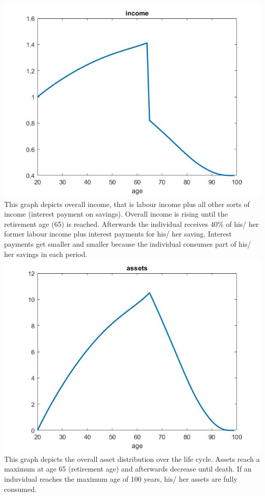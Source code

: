 \documentclass[12pt,a4paper]{article}
\begin{document}
\includegraphics[width=14cm]{Graphs/Figure8} \\
This graph depicts overall income, that is labour income plus all other sorts of income (interest payment on savings). Overall income is rising until the retirement age (65) is reached. Afterwards the individual receives 40\% of his/ her former labour income plus interest payments for his/ her saving. Interest payments get smaller and smaller because the individual consumes part of his/ her savings in each period.\\
\includegraphics[width=14cm]{Graphs/Figure9} \\
This graph depicts the overall asset distribution over the life cycle. Assets reach a maximum at age 65 (retirement age) and afterwards decrease until death. If an induvidual reaches the maximum age of 100 years, his/ her assets are fully consumed. \\
\end{document}
